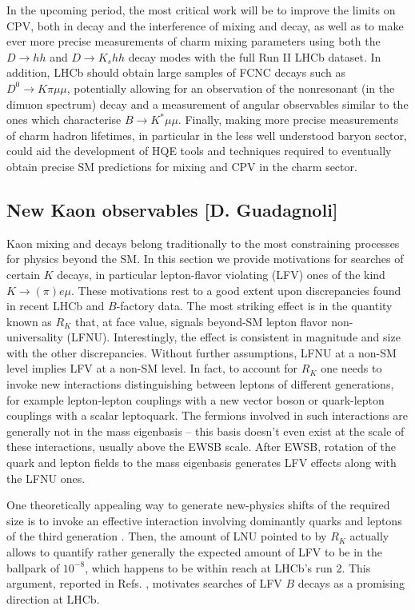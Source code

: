 In the upcoming period, the most critical work will be to improve the limits on CPV, both in decay and the interference of mixing and decay, as well as to make ever more precise measurements of charm mixing parameters using both the $D\to hh$ and $D\to K_s hh$ decay modes with the full Run II LHCb dataset. In addition, LHCb should obtain large samples of FCNC decays such as $D^0\to K \pi\mu\mu$, potentially allowing for an observation of the nonresonant (in the dimuon spectrum) decay and a measurement of angular observables similar to the ones which characterise $B\to K^*\mu\mu$. Finally, making more precise measurements of charm hadron lifetimes, in particular in the less well understood baryon sector, could aid the development of HQE tools and techniques required to eventually obtain precise SM predictions for mixing and CPV in the charm sector.

\subsection{New Kaon observables [D. Guadagnoli]}

Kaon mixing and decays belong traditionally to the most constraining processes for physics beyond the SM. In this section we provide motivations for searches of certain $K$ decays, in particular lepton-flavor violating (LFV) ones of the kind $K \to (\pi) e \mu$. These motivations rest to a good extent upon discrepancies found in recent LHCb and $B$-factory data. The most striking effect is in the quantity known as $R_K$ \cite{Aaij:2014ora} that, at face value, signals beyond-SM lepton flavor non-universality (LFNU). Interestingly, the effect is consistent in magnitude and size with the other discrepancies. Without further assumptions, LFNU at a non-SM level implies LFV at a non-SM level. In fact, to account for $R_K$ one needs to invoke new interactions distinguishing between leptons of different generations, for example lepton-lepton couplings with a new vector boson or quark-lepton couplings with a scalar leptoquark. The fermions involved in such interactions are generally not in the mass eigenbasis -- this basis doesn't even exist at the scale of these interactions, usually above the EWSB scale. After EWSB, rotation of the quark and lepton fields to the mass eigenbasis generates LFV effects along with the LFNU ones.

One theoretically appealing way to generate new-physics shifts of the required size is to invoke an effective interaction involving dominantly quarks and leptons of the third generation \cite{Glashow:2014iga}. Then, the amount of LNU pointed to by $R_K$ actually allows to quantify rather generally the expected amount of LFV to be in the ballpark of $10^{-8}$, which happens to be within reach at LHCb's run 2. This argument, reported in Refs. \cite{Guadagnoli:2016erb,Glashow:2014iga}, motivates searches of LFV $B$ decays as a promising direction at LHCb.


